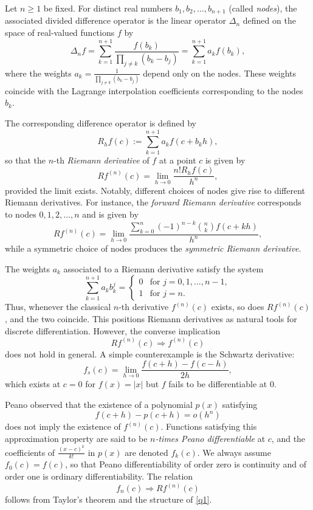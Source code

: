 \documentclass{raex}
\theoremstyle{definition}
\begin{document}
Let $n \geq 1$ be fixed. For distinct real numbers $b_1, b_2, \dots, b_{n+1}$ (called \emph{nodes}), the associated divided difference operator is the linear operator $\Delta_n$ defined on the space of real-valued functions $f$ by
\[
\Delta_n f = \sum_{k=1}^{n+1} \frac{f(b_k)}{\prod_{j \neq k} (b_k - b_j)} = \sum_{k=1}^{n+1} a_k f(b_k),
\]
where the weights $a_k = \frac{1}{\prod_{j \neq k} (b_k - b_j)}$ depend only on the nodes. These weights coincide with the Lagrange interpolation coefficients corresponding to the nodes $b_k$.

The corresponding difference operator is defined by
\[
R_h f(c) := \sum_{k=1}^{n+1} a_k f(c + b_k h),
\]
so that the $n$-th \emph{Riemann derivative} of $f$ at a point $c$ is given by
\[
Rf^{(n)}(c) = \lim_{h \to 0} \frac{n! R_h f(c)}{h^n},
\]
provided the limit exists. Notably, different choices of nodes give rise to different Riemann derivatives. For instance, the \emph{forward Riemann derivative} corresponds to nodes $0,1,2,\dots,n$ and is given by
\[
Rf^{(n)}(c) = \lim_{h \to 0} \frac{\sum_{k=0}^{n} (-1)^{n-k} \binom{n}{k} f(c + kh)}{h^n},
\]
while a symmetric choice of nodes produces the \emph{symmetric Riemann derivative}.

The weights $a_k$ associated to a Riemann derivative satisfy the system
\begin{equation} \label{q1}
\sum_{k=1}^{n+1} a_k b_k^j = 
\begin{cases}
0 & \text{for } j = 0, 1, \dots, n-1, \\
1 & \text{for } j = n.
\end{cases}
\end{equation}
Thus, whenever the classical $n$-th derivative $f^{(n)}(c)$ exists, so does $Rf^{(n)}(c)$, and the two coincide. This positions Riemann derivatives as natural tools for discrete differentiation. However, the converse implication
\[
Rf^{(n)}(c) \Rightarrow f^{(n)}(c)
\]
does not hold in general. A simple counterexample is the Schwartz derivative:
\[
f_s(c) = \lim_{h \to 0} \frac{f(c+h) - f(c-h)}{2h},
\]
which exists at $c = 0$ for $f(x) = |x|$ but $f$ fails to be differentiable at $0$.

Peano observed that the existence of a polynomial $p(x)$ satisfying
\[
f(c+h) - p(c+h) = o(h^n)
\]
does not imply the existence of $f^{(n)}(c)$. Functions satisfying this approximation property are said to be \emph{$n$-times Peano differentiable} at $c$, and the coefficients of $\frac{(x-c)^k}{k!}$ in $p(x)$ are denoted $f_k(c)$. We always assume $f_0(c) = f(c)$, so that Peano differentiability of order zero is continuity and of order one is ordinary differentiability. The relation
\[
f_n(c) \Rightarrow Rf^{(n)}(c)
\]
follows from Taylor’s theorem and the structure of \eqref{q1}.
\end{document}

